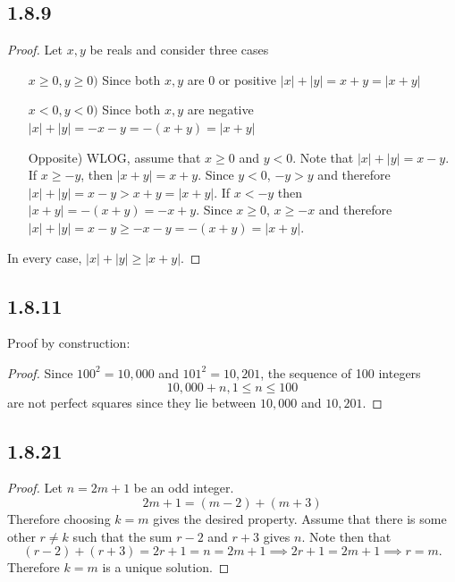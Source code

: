 \documentclass[12pt,titlepage]{extarticle}
\begin{document}
\subsection*{1.8.9}
\begin{proof}
    Let $x,y$ be reals and consider three cases
    \begin{enumerate}[leftmargin=3cm]
        \item[$x \geq 0, y \geq 0)$]
            Since both $x,y$ are $0$ or positive $|x| + |y| = x + y = |x + y|$
        \item[$x < 0, y < 0)$]
            Since both $x,y$ are negative $|x| + |y| = -x - y = -(x+y) = |x+y|$
        \item[Opposite)]
            WLOG, assume that $x \geq 0$ and $y < 0$. Note that $|x| + |y| = x - y$. If $x \geq -y$, then $|x + y| = x+y$. Since $y < 0$, $-y > y$ and therefore $|x| + |y| = x - y > x + y = |x + y|$. If $x < -y$ then $|x + y| = -(x+y) = -x + y$. Since $x \geq 0$, $x \geq -x$ and therefore $|x| + |y| = x - y \geq -x - y = -(x+y) = |x+y|$.
    \end{enumerate}
    In every case, $|x| + |y| \geq |x + y|$.
\end{proof}

\subsection*{1.8.11}
Proof by construction:

\begin{proof}
    Since $100^2 = 10,000$ and $101^2 = 10,201$, the sequence of 100 integers
    \[
        10,000 + n, 1 \leq n \leq 100
    \]
    are not perfect squares since they lie between $10,000$ and $10,201$.
\end{proof}

\subsection*{1.8.21}
\begin{proof}
    Let $n = 2m + 1$ be an odd integer. 
    \[
        2m + 1 = (m-2) + (m+3)
    \]
    Therefore choosing $k = m$ gives the desired property. Assume that there is some other $r \neq k$ such that the sum $r - 2$ and $r + 3$ gives $n$. Note then that
    \[
        (r-2) + (r+3) = 2r + 1 = n = 2m + 1 \implies 2r + 1 = 2m + 1 \implies r = m
    .\]
    Therefore $k = m$ is a unique solution.
\end{proof}
\end{document}
